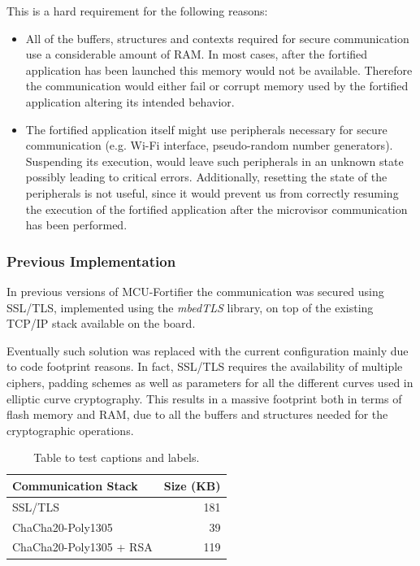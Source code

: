 \documentclass{article}
\begin{document}
This is a hard requirement for the following reasons:
\begin{itemize}
	\item All of the buffers, structures and contexts required for secure communication use a considerable amount of RAM. In most cases, after the fortified application has been launched this memory would not be available. Therefore the communication would either fail or corrupt memory used by the fortified application altering its intended behavior.
	\item The fortified application itself might use peripherals necessary for secure communication (e.g. Wi-Fi interface, pseudo-random number generators). Suspending its execution, would leave such peripherals in an unknown state possibly leading to critical errors. Additionally, resetting the state of the peripherals is not useful, since it would prevent us from correctly resuming the execution of the fortified application after the microvisor communication has been performed.
\end{itemize}


\subsubsection{Previous Implementation}
In previous versions of MCU-Fortifier the communication was secured using SSL/TLS, implemented using the \textit{mbedTLS} library, on top of the existing TCP/IP stack available on the board.

Eventually such solution was replaced with the current configuration mainly due to code footprint reasons. In fact, SSL/TLS requires the availability of multiple ciphers, padding schemes as well as parameters for all the different curves used in elliptic curve cryptography. This results in a massive footprint both in terms of flash memory and RAM, due to all the buffers and structures needed for the cryptographic operations.

\begin{table}[h!]
	\centering
	\begin{tabular}{|l | r|} 
		\hline
		\textbf{Communication Stack} & \textbf{Size (KB)} \\
		\hline
		SSL/TLS & 181 \\ 
		ChaCha20-Poly1305 & 39 \\  
		ChaCha20-Poly1305 + RSA & 119 \\
		\hline
	\end{tabular}
	\caption{Table to test captions and labels.}
	\label{table:comm_size}
\end{table}
\end{document}
